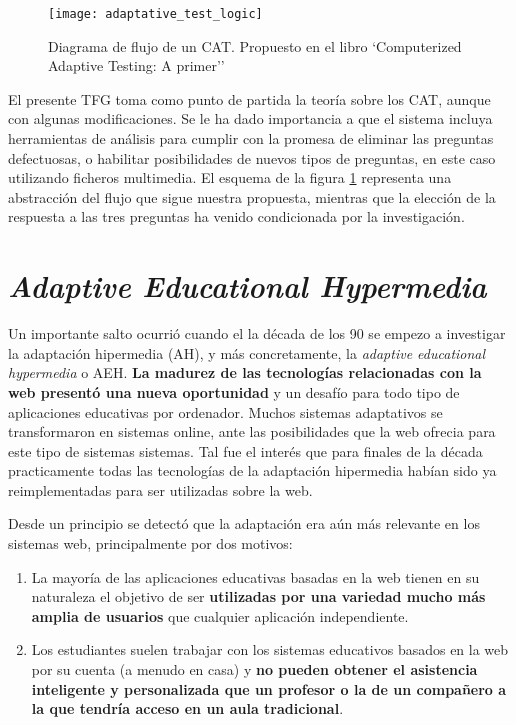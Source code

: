 \begin{figure}[htp!]
	\centering
	\texttt{[image: adaptative\_test\_logic]}
	\caption[Diagrama de flujo de un \acrshort{CAT}]{Diagrama de flujo de un \acrshort{CAT}. Propuesto en el libro `Computerized Adaptive Testing: A primer''\cite{Wainer00}}
	\label{fig:diagrama_flujo_CAT}
\end{figure}

El presente TFG toma como punto de partida la teoría sobre los \acrshort{CAT}, aunque con algunas modificaciones. Se le ha dado importancia a que el sistema incluya herramientas de análisis para cumplir con la promesa de eliminar las preguntas defectuosas, o habilitar posibilidades de nuevos tipos de preguntas, en este caso utilizando ficheros multimedia. El esquema de la figura \ref{fig:diagrama_flujo_CAT} representa una abstracción del flujo que sigue nuestra propuesta, mientras que la elección de la respuesta a las tres preguntas ha venido condicionada por la investigación.
 
\section{\textit{Adaptive Educational Hypermedia}}

Un importante salto ocurrió cuando el la década de los 90 se empezo a investigar la adaptación hipermedia (\acrshort{AH}), y más concretamente, la \textit{adaptive educational hypermedia} o \acrshort{AEH}. \textbf{La madurez de las tecnologías relacionadas con la web presentó una nueva oportunidad} y un desafío para todo tipo de aplicaciones educativas por ordenador. Muchos sistemas adaptativos se transformaron en sistemas online, ante las posibilidades que la web ofrecia para este tipo de sistemas sistemas\cite{Brusilovsky95}\cite{Nakabayashi97}. Tal fue el interés que para finales de la década practicamente todas las tecnologías de la adaptación hipermedia habían sido ya reimplementadas para ser utilizadas sobre la web\cite{Brusilovsky99}.

Desde un principio se detectó que la adaptación era aún más relevante en los sistemas web, principalmente por dos motivos\cite{Weber01}:

\begin{enumerate}
	\item La mayoría de las aplicaciones educativas basadas en la web tienen en su naturaleza el objetivo de ser \textbf{utilizadas por una variedad mucho más amplia de usuarios} que cualquier aplicación independiente.
	\item Los estudiantes suelen trabajar con los sistemas educativos basados en la web por su cuenta (a menudo en casa) y \textbf{no pueden obtener el asistencia inteligente y personalizada que un profesor o la de un  compañero a la que tendría acceso en un aula tradicional}.
\end{enumerate}

